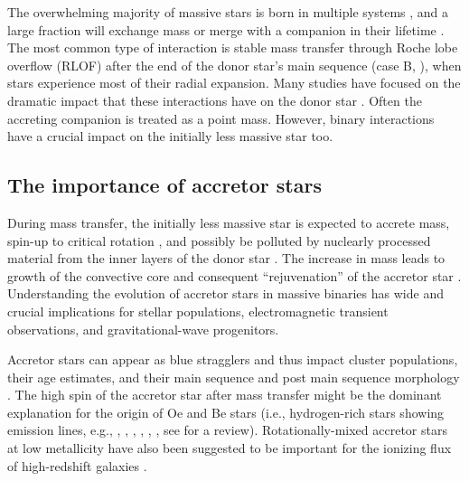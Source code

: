 \documentclass[twocolumn,twocolappendix,trackchanges]{aastex63}
\begin{document}
The overwhelming majority of massive stars is born in multiple systems
\citep[e.g.,][]{mason:09, almeida:17, moe:17}, and a large fraction will
exchange mass or merge with a companion in their lifetime
\citep[e.g.,][]{sana:12}. The most common type of interaction is
stable mass transfer through Roche lobe overflow (RLOF) after the end of the donor star's main sequence (case
B, \citealt{kippenhahn:67}), when stars experience most of their
radial expansion.  Many
studies have focused on the dramatic impact that these interactions have on the
donor star \citep[e.g.,][]{morton:60, yoon:17, gotberg:17, gotberg:18, laplace:20,
  laplace:21, blagorodnova:21}. Often the accreting companion is treated as a point mass.
However, binary interactions have a crucial impact on the initially
less massive star too.

\subsection{The importance of accretor stars}

During mass transfer, the initially less massive star is expected to
accrete mass, spin-up to critical rotation \citep[e.g.,][]{packet:81},
and possibly be polluted by nuclearly processed material from the
inner layers of the donor star \citep[e.g.,][]{blaauw:93}. The
increase in mass leads to growth of
the convective core and consequent
``rejuvenation'' of the accretor star \citep[e.g.,][]{neo:77,
  schneider:16}. Understanding the evolution of accretor stars in massive
binaries has wide and crucial implications for stellar populations,
electromagnetic transient observations, and gravitational-wave
progenitors.

Accretor stars can appear as blue stragglers
\citep[e.g.,][]{chen:09, chen:10, rain:21} and thus impact cluster
populations, their age estimates, and their main sequence
\citep[e.g.,][]{pols_marinus:94, wang:20} and post main sequence morphology
\citep[e.g.,][]{wei:21}. The high spin of the
accretor star after mass transfer might be the dominant explanation for the origin of
Oe and Be stars (i.e., hydrogen-rich stars showing emission lines,
e.g., \citealt{pols:91}, \citealt{bodensteiner:20},
\citealt{vinciguerra:20}, \citealt{dorigo-jones:20}, \citealt{wang:21_sdOBe}, \citealt{hastings:21}, see
\citealt{rivinius:13} for a review). Rotationally-mixed accretor
stars at low metallicity have also been suggested to be important for the ionizing flux of high-redshift
galaxies \citep[e.g.,][]{eldridge:12, stanway:16}.
\end{document}
